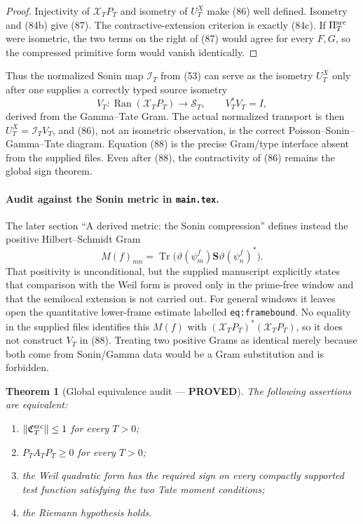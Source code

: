 \documentclass[11pt]{article}
\newtheorem{theorem}{Theorem}
\newcommand{\PROVED}{\textcolor{green!45!black}{\textbf{PROVED}}}
\newcommand{\Ran}{\operatorname{Ran}}
\begin{document}
\begin{proof}
Injectivity of $\mathcal X_TP_T$ and isometry of $U_T^X$ make (86) well
defined.  Isometry and (84b) give (87).  The contractive-extension criterion
is exactly (84c).  If $\Pi_T^{\rm src}$ were isometric, the two terms on the
right of (87) would agree for every $F,G$, so the compressed primitive form
would vanish identically.
\end{proof}

Thus the normalized Sonin map $\mathcal I_T$ from (53) can serve as the
isometry $U_T^X$ only after one supplies a correctly typed source isometry
\begin{equation}
 V_T:\overline{\Ran(\mathcal X_TP_T)}\longrightarrow\mathcal S_T,
 \qquad V_T^*V_T=I,                                    \tag{88}
\end{equation}
derived from the Gamma--Tate Gram.  The actual normalized transport is then
$U_T^X=\mathcal I_TV_T$, and (86), not an isometric observation, is the
correct Poisson--Sonin--Gamma--Tate diagram.  Equation (88) is the precise
Gram/type interface absent from the supplied files.  Even after (88), the
contractivity of (86) remains the global sign theorem.

\paragraph{Audit against the Sonin metric in \texttt{main.tex}.}
The later section ``A derived metric: the Sonin compression'' defines instead
the positive Hilbert--Schmidt Gram
\[
 M(f)_{mn}=\operatorname{Tr}
 \bigl(\vartheta(\psi_m^f)\mathbf S
       \vartheta(\psi_n^f)^*\bigr).
\]
That positivity is unconditional, but the supplied manuscript explicitly
states that comparison with the Weil form is proved only in the prime-free
window and that the semilocal extension is not carried out.  For general
windows it leaves open the quantitative lower-frame estimate labelled
\texttt{eq:framebound}.  No equality in the supplied files identifies this
$M(f)$ with $(\mathcal X_TP_T)^*(\mathcal X_TP_T)$, so it does not construct
$V_T$ in (88).  Treating two positive Grams as identical merely because both
come from Sonin/Gamma data would be a Gram substitution and is forbidden.

\begin{theorem}[Global equivalence audit --- \PROVED]
The following assertions are equivalent:
\begin{enumerate}
\item $\|\mathfrak C_T^{\rm src}\|\le1$ for every $T>0$;
\item $P_TA_TP_T\ge0$ for every $T>0$;
\item the Weil quadratic form has the required sign on every compactly
supported test function satisfying the two Tate moment conditions;
\item the Riemann hypothesis holds.
\end{enumerate}
\end{theorem}
\end{document}

